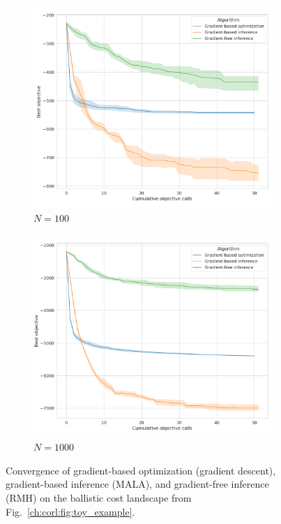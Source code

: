 \begin{figure}[tb]
\begin{subfigure}[t]{0.24\linewidth}
    \end{subfigure}
    \begin{subfigure}[t]{0.24\linewidth}
        \centering
        \includegraphics[width=\linewidth]{images/global_methods/ballistic_100.png}
        \caption{$N=100$}
    \end{subfigure}
    \begin{subfigure}[t]{0.24\linewidth}
        \centering
        \includegraphics[width=\linewidth]{images/global_methods/ballistic_1000.png}
        \caption{$N=1000$}
    \end{subfigure}
    \caption{Convergence of gradient-based optimization (gradient descent), gradient-based inference (MALA), and gradient-free inference (RMH) on the ballistic cost landscape from Fig.~\ref{ch:corl:fig:toy_example}.}
    \label{ch:corl:fig:ballistic_convergence}
\end{figure}

